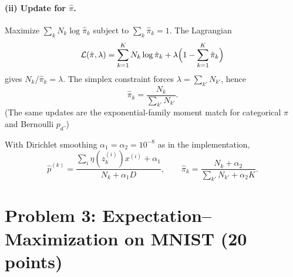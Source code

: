\documentclass[11pt]{article}
\begin{document}
\paragraph{(ii) Update for \(\hat\pi\).}
Maximize \(\sum_k N_k\log\hat\pi_k\) subject to
\(\sum_k\hat\pi_k=1\). The Lagrangian
\[
  \mathcal{L}(\hat\pi,\lambda)
  =\sum_{k=1}^K N_k\log\hat\pi_k
  +\lambda\Bigl(1-\sum_{k=1}^K\hat\pi_k\Bigr)
\]
gives \(N_k/\hat\pi_k=\lambda\). The simplex constraint forces
\(\lambda=\sum_{k'}N_{k'}\), hence
\begin{equation}
  \hat\pi_k
  =\frac{N_k}{\sum_{k'}N_{k'}}.
\end{equation}
(The same updates are the exponential-family moment match for
categorical \(\pi\) and Bernoulli \(p_d\).)

With Dirichlet smoothing \(\alpha_1=\alpha_2=10^{-8}\) as in the
implementation,
\begin{equation}
  \hat p^{(k)}
  =\frac{\sum_i\eta(z_k^{(i)})x^{(i)}+\alpha_1}{N_k+\alpha_1 D},\qquad
  \hat\pi_k
  =\frac{N_k+\alpha_2}{\sum_{k'}N_{k'}+\alpha_2 K}.
\end{equation}

\section{Problem 3: Expectation--Maximization on MNIST (20 points)}
\end{document}
